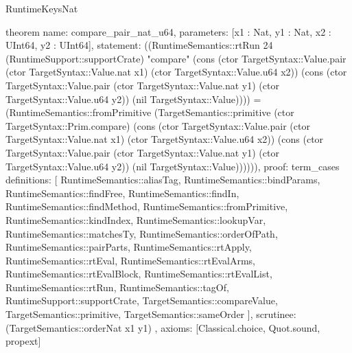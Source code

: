 \begin{lexlean}{RuntimeKeysNat}
\begin{semanticmodule}
theorem{
  name: compare_pair_nat_u64,
  parameters: [x1 : Nat, y1 : Nat, x2 : UInt64, y2 : UInt64],
  statement: ((RuntimeSemantics::rtRun 24 (RuntimeSupport::supportCrate) "compare" (cons (ctor TargetSyntax::Value.pair (ctor TargetSyntax::Value.nat x1) (ctor TargetSyntax::Value.u64 x2)) (cons (ctor TargetSyntax::Value.pair (ctor TargetSyntax::Value.nat y1) (ctor TargetSyntax::Value.u64 y2)) (nil TargetSyntax::Value)))) = (RuntimeSemantics::fromPrimitive (TargetSemantics::primitive (ctor TargetSyntax::Prim.compare) (cons (ctor TargetSyntax::Value.pair (ctor TargetSyntax::Value.nat x1) (ctor TargetSyntax::Value.u64 x2)) (cons (ctor TargetSyntax::Value.pair (ctor TargetSyntax::Value.nat y1) (ctor TargetSyntax::Value.u64 y2)) (nil TargetSyntax::Value)))))),
  proof: term_cases{
    definitions: [
      RuntimeSemantics::aliasTag,
      RuntimeSemantics::bindParams,
      RuntimeSemantics::findFree,
      RuntimeSemantics::findIn,
      RuntimeSemantics::findMethod,
      RuntimeSemantics::fromPrimitive,
      RuntimeSemantics::kindIndex,
      RuntimeSemantics::lookupVar,
      RuntimeSemantics::matchesTy,
      RuntimeSemantics::orderOfPath,
      RuntimeSemantics::pairParts,
      RuntimeSemantics::rtApply,
      RuntimeSemantics::rtEval,
      RuntimeSemantics::rtEvalArms,
      RuntimeSemantics::rtEvalBlock,
      RuntimeSemantics::rtEvalList,
      RuntimeSemantics::rtRun,
      RuntimeSemantics::tagOf,
      RuntimeSupport::supportCrate,
      TargetSemantics::compareValue,
      TargetSemantics::primitive,
      TargetSemantics::sameOrder
    ],
    scrutinee: (TargetSemantics::orderNat x1 y1)
  },
  axioms: [Classical.choice, Quot.sound, propext]
}


\end{semanticmodule}
\end{lexlean}
